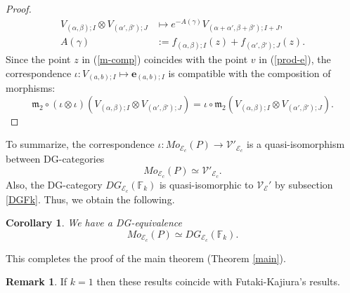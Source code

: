 \documentclass[12pt,reqno]{amsart}
\newcommand{\F}{{\mathbb{F}}}
\newcommand{\Fk}{{\F_k}}
\newcommand{\ee}{{\mathbf{e}}}
\newcommand{\fm}{{\mathfrak{m}}}
\newcommand{\cE}{{\mathcal{E}}}
\newcommand{\cV}{{\mathcal{V}}}
\newtheorem{cor}[thm]{Corollary}%
\theoremstyle{definition}
\newtheorem{rem}[thm]{Remark}%
\begin{document}
\begin{proof}
\begin{equation}
\begin{split}
V_{(\alpha,\beta);I}\otimes V_{(\alpha',\beta');J} &\mapsto e^{-A(\gamma)}V_{(\alpha+\alpha',\beta+\beta');I+J},\\
A(\gamma) &:= f_{(\alpha,\beta);I}(z) + f_{(\alpha',\beta');J}(z).
\end{split}
\end{equation}
Since the point $z$ in (\ref{m-comp}) coincides with the point $v$ in (\ref{prod-e}), the correspondence $\iota:V_{(a,b);I}\mapsto \ee_{(a,b);I}$ is compatible with the composition of morphisms:
\begin{equation*}
\fm_2 \circ (\iota\otimes\iota)\left(V_{(\alpha,\beta);I}\otimes V_{(\alpha',\beta');J}\right) =  \iota \circ \fm_2 \left(V_{(\alpha,\beta);I}\otimes V_{(\alpha',\beta');J}\right).
\end{equation*}
\end{proof}

To summarize, the correspondence $\iota:Mo_{\cE_c}(P)\to\cV'_{\cE_c}$ is a quasi-isomorphism between DG-categories
\begin{equation*}
Mo_{\cE_c}(P)\simeq \cV'_{\cE_c}.
\end{equation*}
Also, the DG-category $DG_{\cE_c}(\Fk)$ is quasi-isomorphic to $\cV_\cE'$ by subsection \ref{DGFk}. Thus, we obtain the following.
\begin{cor}
We have a DG-equivalence
\begin{equation*}
Mo_{\cE_c}(P) \simeq DG_{\cE_c}(\Fk).
\end{equation*}
\end{cor}
This completes the proof of the main theorem (Theorem \ref{main}). 

\begin{rem}
If $k=1$ then these results coincide with Futaki-Kajiura's results\cite{fut-kaj2}.
\end{rem}
\end{document}
